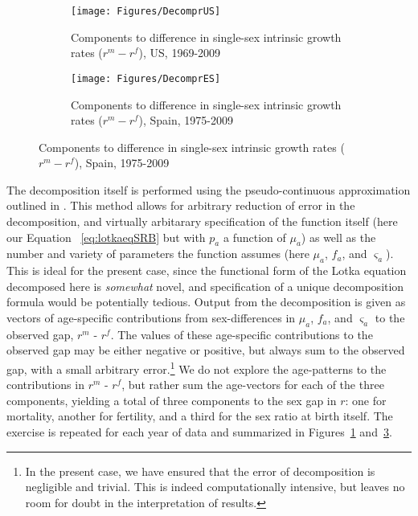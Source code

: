 \begin{figure}[h!]
        \centering
        \begin{subfigure}
                \centering
                \caption{Components to difference in single-sex intrinsic growth
                rates ($r^m - r^f$), US, 1969-2009}
                \texttt{[image: Figures/DecomprUS]}
                \label{fig:DecomprUS}
        \end{subfigure}
        \begin{subfigure}
                \centering
                \caption{Components to difference in single-sex intrinsic growth
                rates ($r^m - r^f$), Spain, 1975-2009}
                \texttt{[image: Figures/DecomprES]}  
                \label{fig:DecomprES}
        \end{subfigure}
\end{figure}

The decomposition itself is performed using the
pseudo-continuous approximation outlined in \citet{horiuchi2008decomposition}. 
This method allows for arbitrary reduction of error in the decomposition, and
virtually arbitarary specification of the function itself (here our Equation
~\eqref{eq:lotkaeqSRB} but with $p_a$ a function of $\mu_a$) as well as the
number and variety of parameters the function assumes (here $\mu _a$, $f_a$, and
$\varsigma _a$). This is ideal for
the present case, since the functional form of the Lotka equation decomposed
here is \textit{somewhat} novel, and specification of a unique decomposition
formula would be potentially tedious. Output from the decomposition is given as
vectors of age-specific contributions from sex-differences in $\mu
_a$, $f_a$, and $\varsigma _a$ to the observed gap, $r^m$ - $r^f$. The values 
of these age-specific contributions to the observed gap may be either negative or
positive, but always sum to the observed gap, with a small arbitrary
error.\footnote{In the present case, we have ensured that the error of
decomposition is negligible and trivial. This is indeed computationally
intensive, but leaves no room for doubt in the interpretation of results.} We
do not explore the age-patterns to the contributions in $r^m$ - $r^f$, but
rather sum the age-vectors for each of the three components, yielding a total of
three components to the sex gap in $r$: one for mortality, another for
fertility, and a third for the sex ratio at birth itself. The exercise is
repeated for each year of data and summarized in Figures~\ref{fig:DecomprUS}
and~\ref{fig:DecomprES}.

